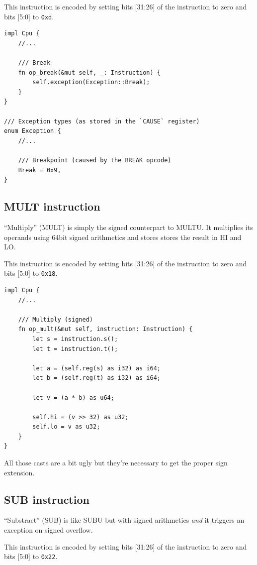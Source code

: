 \documentclass[a4paper]{article}
\newcommand{\code}[1] {\texttt{#1}}
\begin{document}
This instruction is encoded by setting bits [31:26] of the
instruction to zero and bits [5:0] to \code{0xd}.

\begin{lstlisting}
impl Cpu {
    //...

    /// Break
    fn op_break(&mut self, _: Instruction) {
        self.exception(Exception::Break);
    }
}

/// Exception types (as stored in the `CAUSE` register)
enum Exception {
    //...

    /// Breakpoint (caused by the BREAK opcode)
    Break = 0x9,
}
\end{lstlisting}

\subsection{MULT instruction}

``Multiply'' (MULT) is simply the signed counterpart to MULTU. It
multiplies its operands using 64bit signed arithmetics and stores
stores the result in HI and LO.

This instruction is encoded by setting bits [31:26] of the
instruction to zero and bits [5:0] to \code{0x18}.

\begin{lstlisting}
impl Cpu {
    //...

    /// Multiply (signed)
    fn op_mult(&mut self, instruction: Instruction) {
        let s = instruction.s();
        let t = instruction.t();

        let a = (self.reg(s) as i32) as i64;
        let b = (self.reg(t) as i32) as i64;

        let v = (a * b) as u64;

        self.hi = (v >> 32) as u32;
        self.lo = v as u32;
    }
}
\end{lstlisting}

All those casts are a bit ugly but they're necessary to get the proper
sign extension.

\subsection{SUB instruction}

``Substract'' (SUB) is like SUBU but with signed arithmetics
\emph{and} it triggers an exception on signed overflow.

This instruction is encoded by setting bits [31:26] of the
instruction to zero and bits [5:0] to \code{0x22}.
\end{document}
